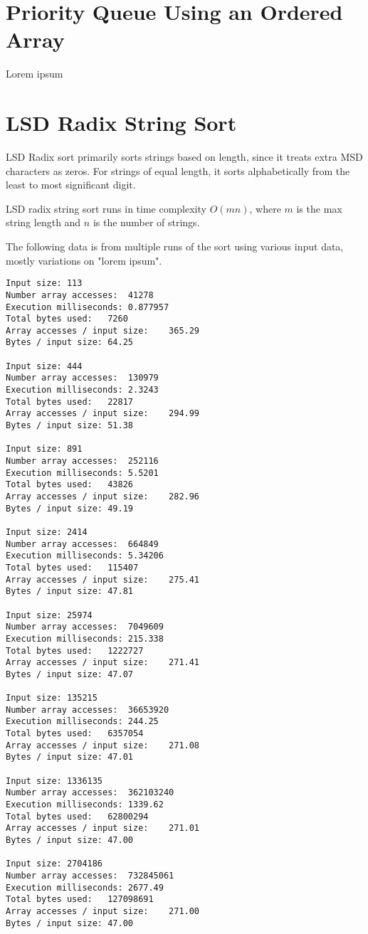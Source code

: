 \documentclass[12pt]{amsart}
\begin{document}
\section{Priority Queue Using an Ordered Array}
    Lorem ipsum

\section{LSD Radix String Sort}
    LSD Radix sort primarily sorts strings based on length,
    since it treats extra MSD characters as zeros. For strings
    of equal length, it sorts alphabetically from the least to
    most significant digit.

    LSD radix string sort runs in time complexity $O(mn)$, where
    $m$ is the max string length and $n$ is the number of
    strings.

    The following data is from multiple runs of the sort using
    various input data, mostly variations on "lorem ipsum".

\begin{verbatim}
Input size:	113
Number array accesses:	41278
Execution milliseconds:	0.877957
Total bytes used:	7260
Array accesses / input size:    365.29
Bytes / input size: 64.25

Input size:	444
Number array accesses:	130979
Execution milliseconds:	2.3243
Total bytes used:	22817
Array accesses / input size:    294.99
Bytes / input size: 51.38

Input size:	891
Number array accesses:	252116
Execution milliseconds:	5.5201
Total bytes used:	43826
Array accesses / input size:    282.96
Bytes / input size: 49.19

Input size:	2414
Number array accesses:	664849
Execution milliseconds:	5.34206
Total bytes used:	115407
Array accesses / input size:    275.41
Bytes / input size: 47.81

Input size:	25974
Number array accesses:	7049609
Execution milliseconds:	215.338
Total bytes used:	1222727
Array accesses / input size:    271.41
Bytes / input size: 47.07

Input size:	135215
Number array accesses:	36653920
Execution milliseconds:	244.25
Total bytes used:	6357054
Array accesses / input size:    271.08
Bytes / input size: 47.01

Input size:	1336135
Number array accesses:	362103240
Execution milliseconds:	1339.62
Total bytes used:	62800294
Array accesses / input size:    271.01
Bytes / input size: 47.00

Input size:	2704186
Number array accesses:	732845061
Execution milliseconds:	2677.49
Total bytes used:	127098691
Array accesses / input size:    271.00
Bytes / input size: 47.00

\end{verbatim}
\end{document}
